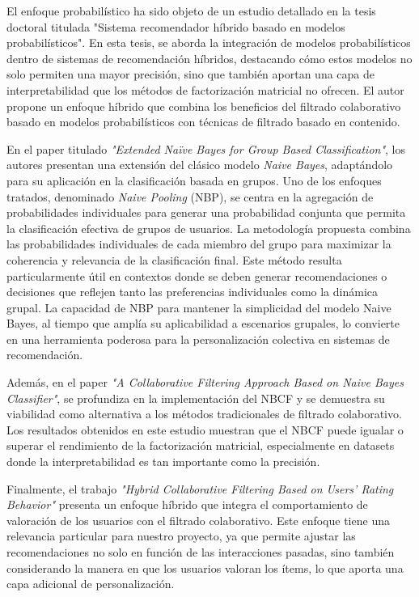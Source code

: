 \documentclass[twocolumn, fontsize=10pt]{article}
\begin{document}
El enfoque probabilístico ha sido objeto de un 
estudio detallado en la tesis doctoral titulada 
"Sistema recomendador híbrido basado en modelos 
probabilísticos"\cite{tesis_sistema_recomendador_hibrido}. En esta tesis, se aborda la 
integración de modelos probabilísticos dentro de 
sistemas de recomendación híbridos, destacando cómo 
estos modelos no solo permiten una mayor precisión, 
sino que también aportan una capa de interpretabilidad 
que los métodos de factorización matricial no ofrecen. 
El autor propone un enfoque híbrido que combina los 
beneficios del filtrado colaborativo basado en modelos 
probabilísticos con técnicas de filtrado basado en 
contenido.

En el paper titulado \textit{"Extended Naïve 
Bayes for Group Based Classification"}\cite{nbp}, los autores 
presentan una extensión del clásico modelo 
\textit{Naive Bayes}, adaptándolo para su aplicación 
en la clasificación basada en grupos. Uno de los 
enfoques tratados, 
denominado \textit{Naive Pooling} (NBP), se centra en la 
agregación de probabilidades individuales para 
generar una probabilidad conjunta que permita la 
clasificación efectiva de grupos de usuarios. La 
metodología propuesta combina las probabilidades 
individuales de cada miembro del grupo para maximizar 
la coherencia y relevancia de la clasificación final. 
Este método resulta particularmente útil en contextos 
donde se deben generar recomendaciones o decisiones 
que reflejen tanto las preferencias individuales 
como la dinámica grupal. La capacidad de NBP para 
mantener la simplicidad del modelo Naive Bayes, 
al tiempo que amplía su aplicabilidad a escenarios 
grupales, lo convierte en una herramienta poderosa 
para la personalización colectiva en sistemas de 
recomendación.

Además, en el paper \textit{"A Collaborative Filtering 
Approach Based on Naive Bayes Classifier"}\cite{nbcf}, 
se profundiza en la implementación del NBCF y se 
demuestra su viabilidad como alternativa a los 
métodos tradicionales de filtrado colaborativo. 
Los resultados obtenidos en este estudio muestran 
que el NBCF puede igualar o superar el rendimiento de 
la factorización matricial, especialmente en datasets 
donde la interpretabilidad es tan importante como la 
precisión.

Finalmente, el trabajo \textit{"Hybrid Collaborative Filtering 
Based on Users' Rating Behavior"}\cite{hybrid_collaborative_filtering} presenta un enfoque 
híbrido que integra el comportamiento de valoración 
de los usuarios con el filtrado colaborativo. 
Este enfoque tiene una relevancia particular para 
nuestro proyecto, ya que permite ajustar las 
recomendaciones no solo en función de las 
interacciones pasadas, sino también considerando la 
manera en que los usuarios valoran los ítems, lo que 
aporta una capa adicional de personalización.
\end{document}
